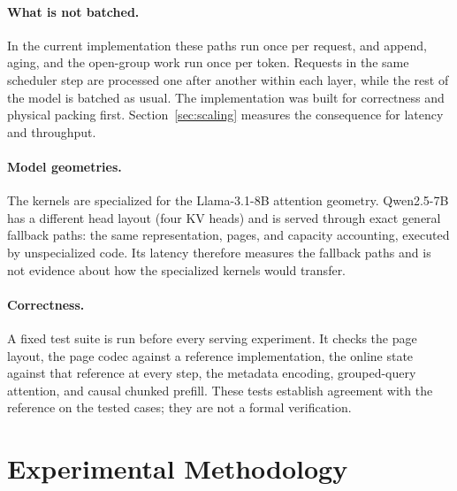 \documentclass{article}
\begin{document}
\paragraph{What is not batched.}
In the current implementation these paths run once per request, and append, aging, and the open-group
work run once per token. Requests in the same scheduler step are processed one after another within
each layer, while the rest of the model is batched as usual. The implementation was built for
correctness and physical packing first. Section~\ref{sec:scaling} measures the consequence for latency and throughput.

\paragraph{Model geometries.}
The kernels are specialized for the Llama-3.1-8B attention geometry. Qwen2.5-7B has a different head
layout (four KV heads) and is served through exact general fallback paths: the same representation, pages, and capacity
accounting, executed by unspecialized code. Its latency therefore measures the fallback paths and is
not evidence about how the specialized kernels would transfer.

\paragraph{Correctness.}
A fixed test suite is run before every serving experiment. It checks the page layout, the page codec
against a reference implementation, the online state against that reference at every step, the
metadata encoding, grouped-query attention, and causal chunked prefill. These tests establish agreement
with the reference on the tested cases; they are not a formal verification.

\section{Experimental Methodology}
\label{sec:method}
\end{document}
